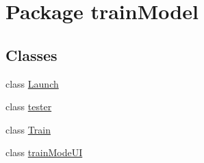 \hypertarget{namespacetrainModel}{}\section{Package train\+Model}
\label{namespacetrainModel}
\subsection*{Classes}
\begin{DoxyCompactItemize}
\item 
class \hyperlink{classtrainModel_1_1Launch}{Launch}
\item 
class \hyperlink{classtrainModel_1_1tester}{tester}
\item 
class \hyperlink{classtrainModel_1_1Train}{Train}
\item 
class \hyperlink{classtrainModel_1_1trainModeUI}{train\+Mode\+UI}
\end{DoxyCompactItemize}
